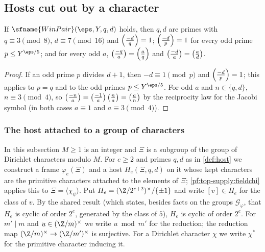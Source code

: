 \subsection{Hosts cut out by a character}\label{sec:pf:top-supply:hosts}

\begin{lemma}\label{pf:top-supply:pairhyp}
If $\sfname{WinPair}(\eps,Y,q,d)$ holds, then $q,d$ are primes with $q\equiv3\pmod8$, $d\equiv7\pmod{16}$ and
$\left(\frac{-d}{q}\right)=1$; $\left(\frac{-d}{p}\right)=1$ for every odd prime $p\le Y^{\eps/5}$; and for every odd $a$,
$\left(\frac{-q}{a}\right)=\left(\frac{a}{q}\right)$ and $\left(\frac{-d}{a}\right)=\left(\frac{a}{d}\right)$. 
\end{lemma}

\begin{proof}
If an odd prime $p$ divides $d+1$, then $-d\equiv1\pmod p$ and $\left(\frac{-d}{p}\right)=1$; this applies to $p=q$ and to the odd
primes $p\le Y^{\eps/5}$. For odd $a$ and $n\in\{q,d\}$, $n\equiv3\pmod4$, so
$\left(\frac{-n}{a}\right)=\left(\frac{-1}{a}\right)\left(\frac{n}{a}\right)=\left(\frac{a}{n}\right)$ by the reciprocity law for the Jacobi symbol (in both
cases $a\equiv1$ and $a\equiv3\pmod4$).
\end{proof}

\subsubsection{The host attached to a group of characters}\label{sec:pf:top-supply:anyhost}

In this subsection $M\ge1$ is an integer and $\Xi$ is a subgroup of the group of Dirichlet characters modulo $M$. For
$e\ge2$ and primes $q,d$ as in \cref{def:host} we construct a frame $\varphi_e(\Xi)$ and a host $H_e(\Xi,q,d)$ on it
whose kept characters are the primitive characters attached to the elements of $\Xi$; \cref{pf:top-supply:fieldchi}
applies this to $\Xi=\langle\chi_\psi\rangle$. Put $H_e=(\Z/2^{e+2})^\times/\{\pm1\}$ and write $[v]\in H_e$ for the class
of $v$. By the shared result  (which states, besides facts on the groups
$\mathcal G_\varphi$, that $H_e$ is cyclic of order $2^e$, generated by the class of $5$), $H_e$ is cyclic of order $2^e$.
For $m'\mid m$ and $u\in(\Z/m)^\times$ we write $u\bmod m'$ for the reduction; the reduction map
$(\Z/m)^\times\to(\Z/m')^\times$ is surjective. For a Dirichlet character $\chi$ we write $\chi^*$ for the primitive character
inducing it.

